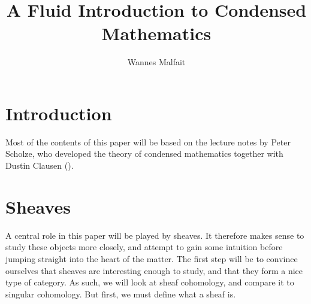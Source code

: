 \documentclass{article}
\title{A Fluid Introduction to Condensed Mathematics}
\author{Wannes Malfait}
\date{}
\begin{document}
\maketitle
\newpage
\tableofcontents

\section{Introduction}
Most of the contents of this paper will be based on the lecture
notes by Peter Scholze, who developed the theory of condensed mathematics
together with Dustin Clausen (\cite{Sch2019LecturesCM}).

\section{Sheaves}
A central role in this paper will be played by sheaves.
It therefore makes sense to study these objects more closely,
and attempt to gain some intuition before jumping straight into
the heart of the matter.
The first step will be to convince ourselves that sheaves
are interesting enough to study, and that they form a nice type
of category. As such, we will look at sheaf cohomology,
and compare it to singular cohomology. But first, we must
define what a sheaf is.
\end{document}
